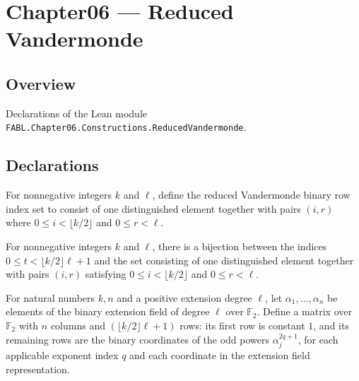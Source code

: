 \chapter{Chapter06 — Reduced Vandermonde}
\section{Overview}

Declarations of the Lean module \texttt{FABL.Chapter06.Constructions.ReducedVandermonde}.

\section{Declarations}

\begin{definition}
\label{FABL.ReducedVandermondeBinaryRow}
\leanok
For nonnegative integers $k$ and $\ell$, define the reduced Vandermonde binary row index
set to consist of one distinguished element together with pairs $(i,r)$ where $0\le
i<\lfloor k/2\rfloor$ and $0\le r<\ell$.
\end{definition}

\begin{definition}
\label{FABL.reducedVandermondeBinaryRowEquiv}
\leanok
{}
For nonnegative integers $k$ and $\ell$, there is a bijection between the indices $0\le
t<\lfloor k/2\rfloor\ell+1$ and the set consisting of one distinguished element together
with pairs $(i,r)$ satisfying $0\le i<\lfloor k/2\rfloor$ and $0\le r<\ell$.
\end{definition}

\begin{definition}
\label{FABL.reducedVandermondeBinaryMatrixOfPoints}
\leanok
{}
For natural numbers $k,n$ and a positive extension degree $\ell$, let
$\alpha_1,\ldots,\alpha_n$ be elements of the binary extension field of degree $\ell$
over $\mathbb{F}_2$. Define a matrix over $\mathbb{F}_2$ with $n$ columns and $(\lfloor
k/2\rfloor\ell+1)$ rows: its first row is constant $1$, and its remaining rows are the
binary coordinates of the odd powers $\alpha_j^{2q+1}$, for each applicable exponent
index $q$ and each coordinate in the extension field representation.
\end{definition}

